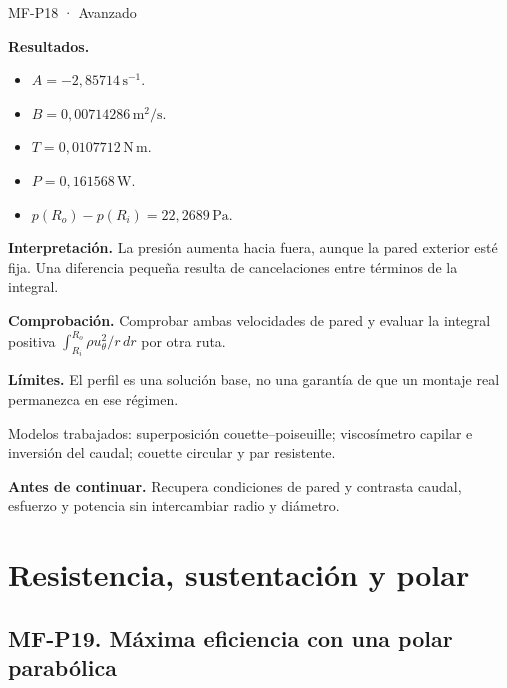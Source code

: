 \begin{studiumworked}{MF-P18 · Avanzado}
\begin{enumerate}
\end{enumerate}

\textbf{Resultados.}\begin{itemize}

\item $A=-2{,}85714\,\mathrm{s^{-1}}$.

\item $B=0{,}00714286\,\mathrm{m^2/s}$.

\item $T=0{,}0107712\,\mathrm{N\,m}$.

\item $P=0{,}161568\,\mathrm{W}$.

\item $p(R_o)-p(R_i)=22{,}2689\,\mathrm{Pa}$.

\end{itemize}

\textbf{Interpretación.} La presión aumenta hacia fuera, aunque la pared exterior esté fija. Una diferencia pequeña resulta de cancelaciones entre términos de la integral.

\textbf{Comprobación.} Comprobar ambas velocidades de pared y evaluar la integral positiva $\int_{R_i}^{R_o}\rho u_\theta^2/r\,dr$ por otra ruta.

\textbf{Límites.} El perfil es una solución base, no una garantía de que un montaje real permanezca en ese régimen.

\end{studiumworked}



\begin{tcolorbox}[studiumcheck,breakable=false,title={Síntesis y comprobación}]Modelos trabajados: superposición couette--poiseuille; viscosímetro capilar e inversión del caudal; couette circular y par resistente.\par\textbf{Antes de continuar.} Recupera condiciones de pared y contrasta caudal, esfuerzo y potencia sin intercambiar radio y diámetro.\end{tcolorbox}

\chapter{Resistencia, sustentación y polar}


\Needspace{.30\textheight}\section{MF-P19. Máxima eficiencia con una polar parabólica}

